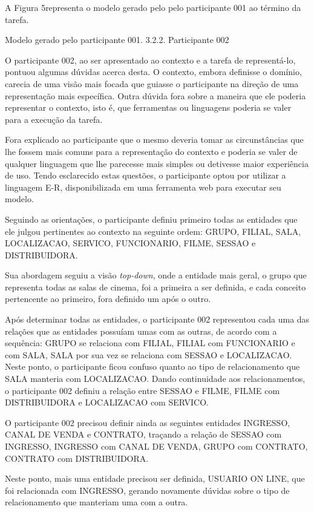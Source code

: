 A Figura 5representa o modelo gerado pelo pelo participante 001 ao término da tarefa.


Modelo gerado pelo participante 001.
3.2.2. Participante 002

O participante 002, ao ser apresentado ao contexto e a tarefa de representá-lo, pontuou algumas dúvidas acerca desta. O contexto, embora definisse o domínio, carecia de uma visão mais focada que guiasse o participante na direção de uma representação mais específica. Outra dúvida fora sobre a maneira que ele poderia representar o contexto, isto é, que ferramentas ou linguagens poderia se valer para a execução da tarefa.

Fora explicado ao participante que o mesmo deveria tomar as circunstâncias que lhe fossem mais comuns para a representação do contexto e poderia se valer de qualquer linguagem que lhe parecesse mais simples ou detivesse maior experiência de uso. Tendo esclarecido estas questões, o participante optou por utilizar a linguagem E-R, disponibilizada em uma ferramenta web para executar seu modelo.

Seguindo as orientações, o participante definiu primeiro todas as entidades que ele julgou pertinentes ao contexto na seguinte ordem: GRUPO, FILIAL, SALA, LOCALIZACAO, SERVICO, FUNCIONARIO, FILME, SESSAO e DISTRIBUIDORA.

Sua abordagem seguiu a visão \textit{top-down}, onde a entidade mais geral, o grupo que representa todas as salas de cinema, foi a primeira a ser definida, e cada conceito pertencente ao primeiro, fora definido um após o outro.

Após determinar todas as entidades, o participante 002 representou cada uma das relações que as entidades possuíam umas com as outras, de acordo com a sequência: GRUPO se relaciona com FILIAL, FILIAL com FUNCIONARIO e com SALA, SALA por sua vez se relaciona com SESSAO e LOCALIZACAO. Neste ponto, o participante ficou confuso quanto ao tipo de relacionamento que SALA manteria com LOCALIZACAO. Dando continuidade aos relacionamentos, o participante 002 definiu a relação entre SESSAO e FILME, FILME com DISTRIBUIDORA e LOCALIZACAO com SERVICO.

O participante 002 precisou definir ainda as seguintes entidades INGRESSO, CANAL DE VENDA e CONTRATO, traçando a relação de SESSAO com INGRESSO, INGRESSO com CANAL DE VENDA, GRUPO com CONTRATO, CONTRATO com DISTRIBUIDORA.

Neste ponto, mais uma entidade precisou ser definida, USUARIO ON LINE, que foi relacionada com INGRESSO, gerando novamente dúvidas sobre o tipo de relacionamento que manteriam uma com a outra.

